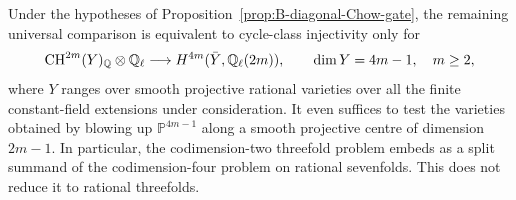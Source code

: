 \begin{proposition}
\label{prop:B-rational-blowup-gate}
Under the hypotheses of Proposition~\ref{prop:B-diagonal-Chow-gate},
the remaining universal comparison is equivalent to cycle-class
injectivity only for
\[
 \operatorname{CH}^{2m}(Y)_\mathbb Q\otimes\mathbb Q_\ell
       \longrightarrow H^{4m}(\bar Y,\mathbb Q_\ell(2m)),
 \qquad \dim Y=4m-1,\quad m\ge2,
\]
where \(Y\) ranges over smooth projective rational varieties over
all the finite constant-field extensions under consideration.
It even suffices to test the varieties obtained by blowing up
\(\mathbb P^{4m-1}\) along a smooth projective centre of
dimension \(2m-1\).
In particular, the codimension-two threefold problem embeds as a
split summand of the codimension-four problem on rational
sevenfolds.  This does not reduce it to rational threefolds.
\end{proposition}
